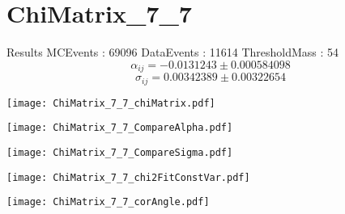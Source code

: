 \documentclass[a4paper,12pt]{article}
\begin{document}
\section{ChiMatrix\_7\_7}
\begin{minipage}{0.49\linewidth} Results \newline
MCEvents : 69096\newline
DataEvents : 11614 \newline
ThresholdMass : 54\\
$$\alpha_{ij} = -0.0131243\pm 0.000584098$$
$$\sigma_{ij} = 0.00342389\pm 0.00322654$$
\end{minipage}\hfill
\begin{minipage}{0.49\linewidth} 
\texttt{[image: ChiMatrix\_7\_7\_chiMatrix.pdf]}\\
\end{minipage}
\hfill
\begin{minipage}{0.49\linewidth} 
\texttt{[image: ChiMatrix\_7\_7\_CompareAlpha.pdf]}\\
\end{minipage}
\hfill
\begin{minipage}{0.49\linewidth} 
\texttt{[image: ChiMatrix\_7\_7\_CompareSigma.pdf]}\\
\end{minipage}
\begin{minipage}{0.49\linewidth} 
\texttt{[image: ChiMatrix\_7\_7\_chi2FitConstVar.pdf]}\\
\end{minipage}
\hfill
\begin{minipage}{0.49\linewidth} 
\texttt{[image: ChiMatrix\_7\_7\_corAngle.pdf]}\\
\end{minipage}
\end{document}

